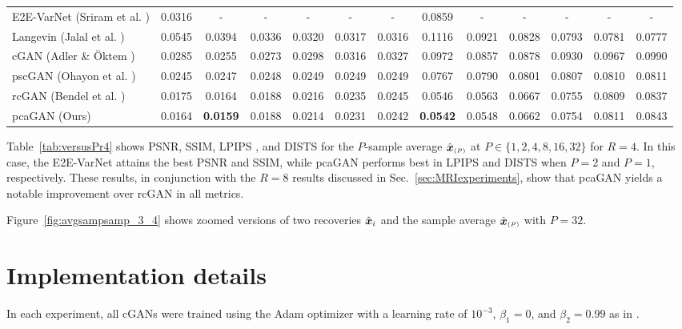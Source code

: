 \documentclass{article}
\theoremstyle{plain}
\theoremstyle{definition}
\theoremstyle{remark}
\newcommand{\hvec}[1]{\ensuremath{\Hat{\boldsymbol{#1}}}}
\newcommand{\Figref}[1]{Figure~\ref{fig:#1}}
\newcommand{\tabref}[1]{Table~\ref{tab:#1}}
\newcommand{\secref}[1]{Sec.~\ref{sec:#1}}
\newcommand{\avgP}{_{\scriptscriptstyle (P)}}
\begin{document}
\begin{table}[t]
{\begin{tabular}{lcccccccccccc}
    \midrule
    E2E-VarNet (Sriram et al. \cite{Sriram:MICCAI:20}) & 0.0316 & - & - & - & - & - & 0.0859 & - & - & - & - & -\\
    Langevin (Jalal et al. \cite{Jalal:NIPS:21}) 
          & 0.0545 & 0.0394 & 0.0336 & 0.0320 & 0.0317 & 0.0316 &  0.1116 & 0.0921 & 0.0828 & 0.0793 & 0.0781 & 0.0777\\
    cGAN (Adler \& \"Oktem \cite{Adler:18}) 
          & 0.0285 & 0.0255 & 0.0273 & 0.0298 & 0.0316 & 0.0327 &  0.0972 & 0.0857 & 0.0878 & 0.0930 & 0.0967 & 0.0990\\
    pscGAN (Ohayon et al. \cite{Ohayon:ICCVW:21}) 
          & 0.0245 & 0.0247 & 0.0248 & 0.0249 & 0.0249 & 0.0249 &  0.0767 & 0.0790 & 0.0801 & 0.0807 & 0.0810 & 0.0811\\
    rcGAN (Bendel et al. \cite{Bendel:NIPS:23}) 
          & 0.0175 & 0.0164 & 0.0188 & 0.0216 & 0.0235 & 0.0245 & 0.0546 & 0.0563 & 0.0667 & 0.0755 & 0.0809 & 0.0837\\
    pcaGAN (Ours) & 0.0164 & \bf 0.0159 & 0.0188 & 0.0214 & 0.0231 & 0.0242 &  \bf 0.0542 & 0.0548 & 0.0662 & 0.0754 & 0.0811 & 0.0843\\
    \bottomrule
  \end{tabular}%
  }
\end{table}

\tabref{versusPr4} shows PSNR, SSIM, LPIPS \cite{Zhang:CVPR:18}, and DISTS \cite{Ding:TPAMI:20} for the $P$-sample average $\hvec{x}\avgP$ at $P\in\{1,2,4,8,16,32\}$ for $R=4$.
In this case, the E2E-VarNet attains the best PSNR and SSIM, while pcaGAN performs best in LPIPS and DISTS when $P=2$ and $P=1$, respectively.
These results, in conjunction with the $R=8$ results discussed in \secref{MRIexperiments}, show that pcaGAN yields a notable improvement over rcGAN in all metrics.


\Figref{avgsampsamp_3_4} shows zoomed versions of two recoveries $\hvec{x}_i$ and the sample average $\hvec{x}\avgP$ with $P=32$.

\section{Implementation details}\label{app:implementation}
In each experiment, all cGANs were trained using the Adam optimizer with a learning rate of $10^{-3}$, $\beta_1=0$, and $\beta_2=0.99$ as in \cite{Karras:ICLR:18}.
\end{document}
